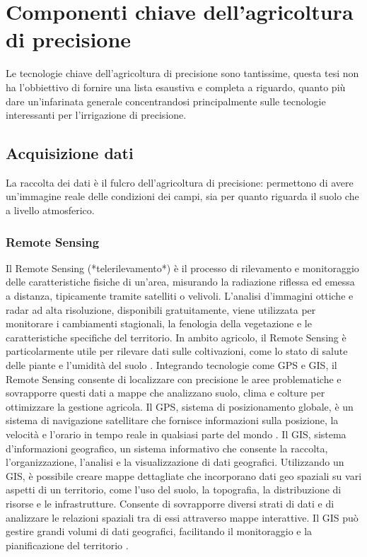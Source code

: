 \documentclass[12pt,a4paper,openright,twoside]{book}
\begin{document}
\section{Componenti chiave dell’agricoltura di precisione}
\label{componenti-chiave}

Le tecnologie chiave dell'agricoltura di precisione sono tantissime, questa tesi non ha l'obbiettivo di fornire una lista esaustiva e completa a riguardo, quanto più dare un'infarinata generale concentrandosi principalmente sulle tecnologie interessanti per l'irrigazione di precisione.
\subsection{Acquisizione dati}
La raccolta dei dati è il fulcro dell'agricoltura di precisione: permettono di avere un'immagine reale delle condizioni dei campi, sia per quanto riguarda il suolo che a livello atmosferico.

\subsubsection{Remote Sensing}

Il Remote Sensing (*telerilevamento*) è il processo di rilevamento e monitoraggio delle caratteristiche fisiche di un'area, misurando la radiazione riflessa ed emessa a distanza, tipicamente tramite satelliti o velivoli\cite{USGS-REMOTE-SENSING}.
L'analisi d'immagini ottiche e radar ad alta risoluzione, disponibili gratuitamente, viene utilizzata per monitorare i cambiamenti stagionali, la fenologia della vegetazione e le caratteristiche specifiche del territorio.
In ambito agricolo, il Remote Sensing è particolarmente utile per rilevare dati sulle coltivazioni, come lo stato di salute delle piante e l'umidità del suolo \cite{FAO-REMOTE-SENSING}. Integrando tecnologie come \ac{GPS} e \ac{GIS}, il Remote Sensing consente di localizzare con precisione le aree problematiche e sovrapporre questi dati a mappe che analizzano suolo, clima e colture per ottimizzare la gestione agricola.
Il \ac{GPS}, sistema di posizionamento globale, è un sistema di navigazione satellitare che fornisce informazioni sulla posizione, la velocità e l'orario in tempo reale in qualsiasi parte del mondo \cite{GPS-GOV}.
Il \ac{GIS}, sistema d'informazioni geografico, un sistema informativo che consente la raccolta, l'organizzazione, l'analisi e la visualizzazione di dati geografici. Utilizzando un GIS, è possibile creare mappe dettagliate che incorporano dati geo spaziali su vari aspetti di un territorio, come l'uso del suolo, la topografia, la distribuzione di risorse e le infrastrutture. Consente di sovrapporre diversi strati di dati e di analizzare le relazioni spaziali tra di essi attraverso mappe interattive. Il GIS può gestire grandi volumi di dati geografici, facilitando il monitoraggio e la pianificazione del territorio \cite{GIS-ESRI}.
\end{document}
